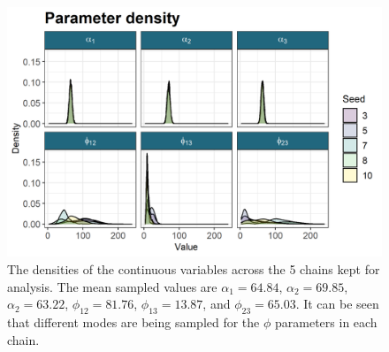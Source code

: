 \documentclass[]{article}
\begin{document}
\begin{figure}
	\centering
	\includegraphics[scale=1]{../Images/Yeast/densityPlotReduced.png}
	\caption{The densities of the continuous variables across the 5 chains kept for analysis. The mean sampled values are $\alpha_1= 64.84$, $\alpha_2 = 69.85$, $\alpha_2 = 63.22$, $\phi_{12} = 81.76$, $\phi_{13} = 13.87$, and $\phi_{23} = 65.03$. It can be seen that different modes are being sampled for the $\phi$ parameters in each chain.
	}
	\label{fig:bayesDensities}
\end{figure}
\end{document}
